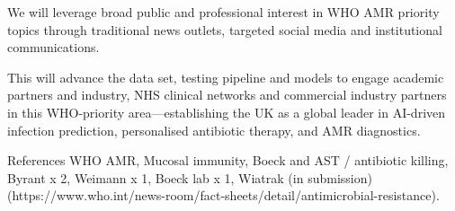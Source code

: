 We will leverage broad public and professional interest in WHO AMR priority topics through traditional news outlets, targeted social media and institutional communications. 

This will advance the data set, testing pipeline and models to engage academic partners and industry, NHS clinical networks and commercial industry partners in this WHO-priority area—establishing the UK as a global leader in AI-driven infection prediction, personalised antibiotic therapy, and AMR diagnostics.

References
WHO AMR, Mucosal immunity, Boeck and AST / antibiotic killing, Byrant x 2, Weimann x 1, Boeck lab x 1, Wiatrak (in submission)
 (https://www.who.int/news-room/fact-sheets/detail/antimicrobial-resistance).
